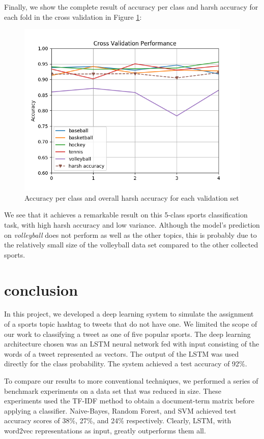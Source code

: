 \documentclass[journal, a4paper]{IEEEtran}
\begin{document}
Finally, we show the complete result of accuracy per class and harsh accuracy for each fold in the cross validation in Figure \ref{fig:5}:
\begin{figure}[!hbt]
	\centering
	\includegraphics[width=\columnwidth]{cv.png}
	\caption{Accuracy per class and overall harsh accuracy for each validation set}
	\label{fig:5}
\end{figure}


We see that it achieves a remarkable result on this 5-class sports classification task, with high harsh accuracy and low variance. Although the model's prediction on \textit{volleyball} does not perform as well as the other topics, this is probably due to the relatively small size of the volleyball data set compared to the other collected sports.
\section{conclusion}
In this project, we developed a deep learning system to simulate the assignment of a sports topic hashtag to tweets that do not have one. We limited the scope of our work to classifying a tweet as one of five popular sports. The deep learning architecture chosen was an LSTM neural network fed with input consisting of the words of a tweet represented as vectors. The output of the LSTM was used directly for the class probability. The system achieved a test accuracy of 92\%.

To compare our results to more conventional techniques, we performed a series of benchmark experiments on a data set that was reduced in size. These experiments used the TF-IDF method to obtain a document-term matrix before applying a classifier. Naive-Bayes, Random Forest, and SVM achieved test accuracy scores of 38\%, 27\%, and 24\% respectively. Clearly, LSTM, with word2vec representations as input, greatly outperforms them all.
\end{document}

